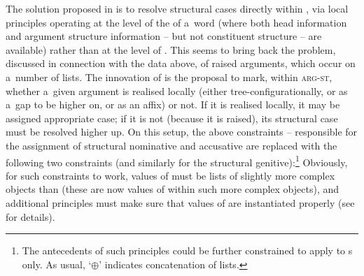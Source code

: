 \documentclass[output=paper
 	        ,biblatex
                ,babelshorthands
                ,newtxmath
                ,draftmode
                ,colorlinks, citecolor=brown
]{langscibook}
\begin{document}
The solution proposed in \citet{prze:96,Prze99b,Prze99} is to resolve structural cases directly within , via local principles operating at the level of the  of a~word (where both head information and argument structure information – but not constituent structure – are available) rather than at the level of .  This seems to bring back the problem, discussed in connection with the  data above, of raised arguments, which occur on a~number of  lists.  The innovation of \citet{prze:96,Prze99b,Prze99} is the proposal to mark, within \textsc{arg-st}, whether a~given argument is realised locally (either tree-con\-fi\-gu\-ra\-tio\-nal\-ly, or as a~gap to be  higher on, or as an affix) or not.  If it is realised locally, it may be assigned appropriate case; if it is not (because it is raised), its structural case must be resolved higher up.  On this setup, the above constraints – responsible for the assignment of structural nominative and accusative are replaced with the following two constraints (and similarly for the structural genitive):\footnote{The antecedents of such principles could be further constrained to apply to s only. As usual, `$\oplus$' indicates concatenation of lists.}
\ea
\label{nonc:cp:germ1}
\ex \label{nonc:cp:germ2}
\z
Obviously, for such constraints to work, values of  must be lists of slightly more complex objects than  (these are now values of  within such more complex objects), and additional principles must make sure that values of  are instantiated properly (see \citealt[78–79]{Prze99b} for details).
\end{document}
